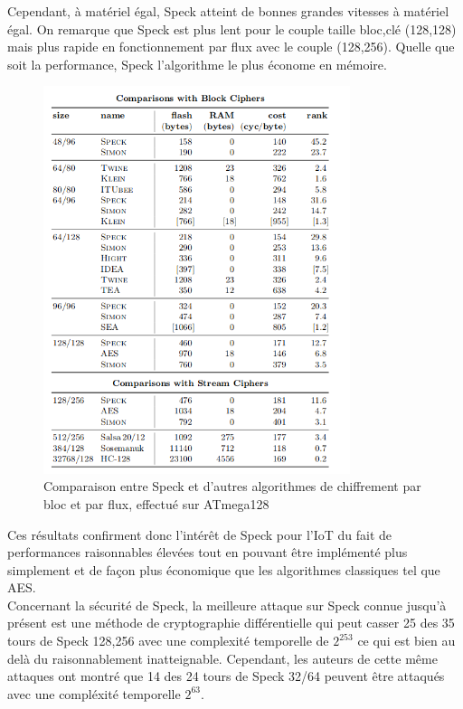 			Cependant, à matériel égal, Speck atteint de bonnes grandes vitesses à matériel
			égal. On remarque que Speck est plus lent pour le couple taille bloc,clé
			(128,128) mais plus rapide en fonctionnement par flux avec le couple (128,256).
			Quelle que soit la performance, Speck l'algorithme le plus économe en mémoire.


			\begin{figure}[H]
				\centering
				\includegraphics[width=0.8\textwidth]{imgs/perfSpeck.png}
				\caption{Comparaison entre Speck et d'autres algorithmes de chiffrement par bloc et par flux, effectué sur ATmega128 \cite{speck_micro}}
				\label{perfSpeck}
			\end{figure}

			Ces résultats confirment donc l'intérêt de Speck pour l'IoT du fait de performances
			raisonnables élevées tout en pouvant être implémenté plus simplement et de façon
			plus économique que	les algorithmes classiques tel que AES.  \\

			Concernant la sécurité de Speck, la meilleure attaque sur Speck connue
			jusqu'à présent est une méthode de cryptographie différentielle qui peut
			casser 25 des 35 tours de Speck 128,256 avec une complexité temporelle de
			$2^253$ \cite{speck_attack} ce qui est bien au delà du raisonnablement inatteignable.
			Cependant, les auteurs de cette même attaques ont montré que 14 des 24
			tours de Speck 32/64 peuvent être attaqués avec une compléxité temporelle $2^63$. \\


